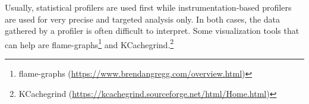 Usually, statistical profilers are used first while instrumentation-based profilers are used for very precise and targeted analysis only. In both cases, the data gathered by a profiler is often difficult to interpret. Some visualization tools that can help are flame-graphs\footnote{flame-graphs (\url{https://www.brendangregg.com/overview.html})} and KCachegrind.\footnote{KCachegrind (\url{https://kcachegrind.sourceforge.net/html/Home.html})}
